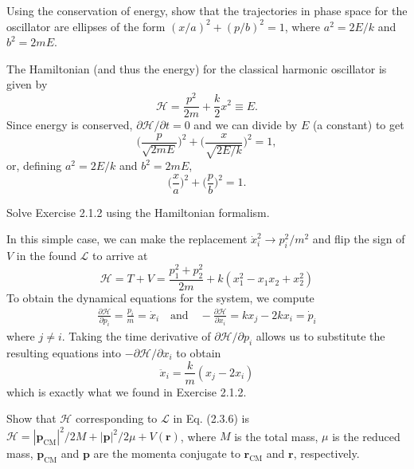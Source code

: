 \documentclass[../principles-of-quantum-mechanics.tex]{subfiles}
\begin{document}
\begin{questions}
		\question Using the conservation of energy, show that the trajectories in phase space for the oscillator are ellipses of the form $(x/a)^2 + (p/b)^2 = 1$, where $a^2 = 2E/k$ and $b^2 = 2mE$.
		
		\begin{solution}
			The Hamiltonian (and thus the energy) for the classical harmonic oscillator is given by
			\[
				\mathcal{H} = \frac{p^2}{2m} + \frac{k}{2}x^2 \equiv E.
			\]
			Since energy is conserved, $\partial\mathcal{H}/\partial{t} = 0$ and we can divide by $E$ (a constant) to get
			\[
				\Big(\frac{p}{\sqrt{2mE}}\Big)^2 + \Big(\frac{x}{\sqrt{2E/k}}\Big)^2 = 1,
			\]
			or, defining $a^2 = 2E/k$ and $b^2 = 2mE$,
			\[
				\Big(\frac{x}{a}\Big)^2 + \Big(\frac{p}{b}\Big)^2 = 1.
			\]
		\end{solution}
		
		\question Solve Exercise 2.1.2 using the Hamiltonian formalism.
		
		\begin{solution}
			In this simple case, we can make the replacement $\dot{x}_i^2 \to p_i^2/m^2$ and flip the sign of $V$ in the found $\mathcal{L}$ to arrive at
			\[
				\mathcal{H} = T + V = \frac{p_1^2 + p_2^2}{2m} + k(x_1^2 - x_1x_2 + x_2^2)
			\]
			To obtain the dynamical equations for the system, we compute
			\begin{align*}
				\frac{\partial\mathcal{H}}{\partial p_i} = \frac{p_i}{m} = \dot{x}_i \quad \text{and} \quad -\frac{\partial\mathcal{H}}{\partial x_i} = kx_j - 2kx_i = \dot{p}_i
			\end{align*}
			where $j \neq i$. Taking the time derivative of $\partial\mathcal{H}/\partial p_i$ allows us to substitute the resulting equations into $-\partial\mathcal{H}/\partial{x}_i$ to obtain
			\[
				\ddot{x}_i = \frac{k}{m}(x_j - 2x_i)
			\]
			which is exactly what we found in Exercise 2.1.2.
		\end{solution}
		
		\question Show that $\mathcal{H}$ corresponding to $\mathcal{L}$ in Eq. (2.3.6) is $\mathcal{H}=|\mathbf{p}_{\text{CM}}|^2/2M + |\mathbf{p}|^2/2\mu + V(\mathbf{r})$, where $M$ is the total mass, $\mu$ is the reduced mass, $\mathbf{p}_{\text{CM}}$ and $\mathbf{p}$ are the momenta conjugate to $\mathbf{r}_{\text{CM}}$ and $\mathbf{r}$, respectively.
		

\end{questions}
\end{document}
